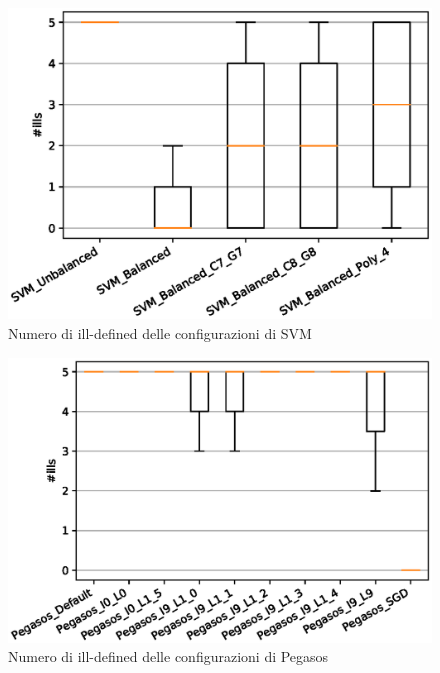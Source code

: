 
\newpage

\vspace*{\fill}

\begin{figure}[hb]%
    \centering
    \includegraphics[scale = 0.80]{CC-SVM-ills}%
    \caption{Numero di ill-defined delle configurazioni di SVM}%
    \label{figure:ill12}%
\end{figure}

\vspace*{\fill}

\clearpage

\vspace*{\fill}

\begin{figure}[hpt!]%
    \centering
    \includegraphics[scale = 0.80]{CC-Pegasos-ills}%
    \caption{Numero di ill-defined delle configurazioni di Pegasos}%
    \label{figure:ill13}%
\end{figure}

